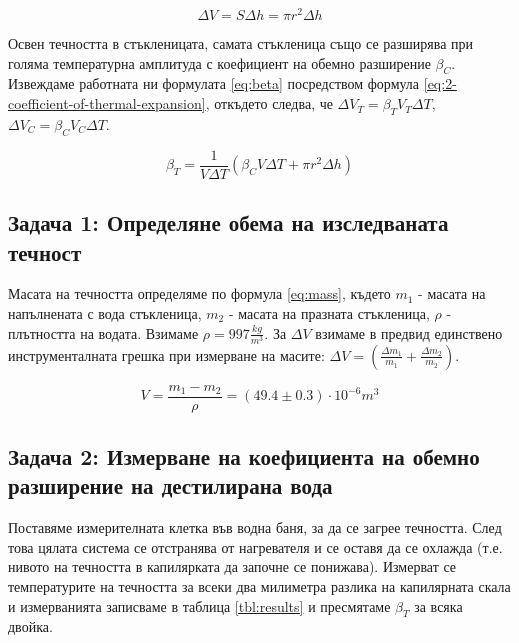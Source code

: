 \documentclass[12pt]{article}
\begin{document}
\begin{equation}\label{eq:delta-h}
    \Delta V = S\Delta h = \pi r^2\Delta h    
\end{equation}

Освен течността в стъкленицата, самата стъкленица също се разширява при голяма температурна амплитуда с коефициент на обемно разширение $\beta_C$. Извеждаме работната ни формулата \ref{eq:beta} посредством формула \ref{eq:2-coefficient-of-thermal-expansion}, откъдето следва, че $\Delta V_T = \beta_T V_T \Delta T$, $\Delta V_C = \beta_C V_C \Delta T$.

\begin{equation}\label{eq:beta}
    \beta_T = \frac{1}{V\Delta T}(\beta_C V \Delta T + \pi r^2\Delta h)
\end{equation}

\subsection{Задача 1: Определяне обема на изследваната течност}
Масата на течността определяме по формула \ref{eq:mass}, където $m_1$ - масата на напълнената с вода стъкленица, $m_2$ - масата на празната стъкленица, $\rho$ - плътността на водата. Взимаме $\rho = 997 \frac{kg}{m^3}$. За $\Delta V$ взимаме в предвид единствено инструменталната грешка при измерване на масите: $\Delta V = (\frac{\Delta m_1}{m_1} + \frac{\Delta m_2}{m_2})$.

\begin{equation}\label{eq:mass}
    V = \frac{m_1 - m_2}{\rho} = (49.4 \pm 0.3 )\cdot 10^{-6} m^3
\end{equation}
\subsection{Задача 2: Измерване на коефициента на обемно разширение на дестилирана вода}
Поставяме измерителната клетка във водна баня, за да се загрее течността. След това цялата система се отстранява от нагревателя и се оставя да се охлажда (т.е. нивото на течността в капилярката да започне се понижава). Измерват се температурите на течността за всеки два милиметра разлика на капилярната скала и измерванията записваме в таблица \ref{tbl:results} и пресмятаме $\beta_T$ за всяка двойка.
\end{document}
